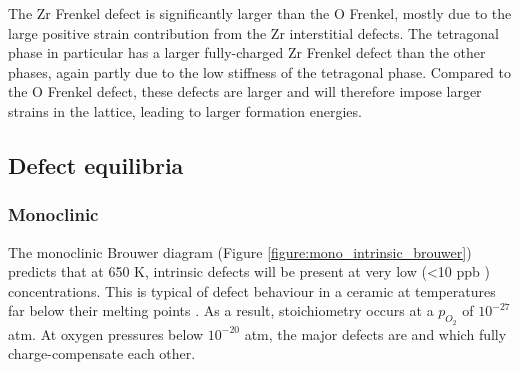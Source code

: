The Zr Frenkel defect is significantly larger than the O Frenkel, mostly due to the large positive strain contribution from the Zr interstitial defects. The tetragonal phase in particular has a larger fully-charged Zr Frenkel defect than the other phases, again partly due to the low stiffness of the tetragonal phase. Compared to the O Frenkel defect, these defects are larger and will therefore impose larger strains in the lattice, leading to larger formation energies. 

\subsection{Defect equilibria} \label{brouwer_discussion_intrinsic}

\subsubsection*{Monoclinic}

The monoclinic Brouwer diagram (Figure \ref{figure:mono_intrinsic_brouwer}) predicts that at 650 K, intrinsic defects will be present at very low (\textless 10 ppb \zirconia ) concentrations. This is typical of defect behaviour in a ceramic at temperatures far below their melting points \cite{kingery1997physical,ball2006computer}. As a result, stoichiometry occurs at a $p_{O_{2}}$ of $10^{-27}$ atm. At oxygen pressures below $10^{-20}$ atm, the major defects are  and  which fully charge-compensate each other. 

